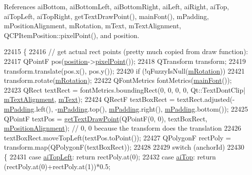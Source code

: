 References ai\+Bottom, ai\+Bottom\+Left, ai\+Bottom\+Right, ai\+Left, ai\+Right, ai\+Top, ai\+Top\+Left, ai\+Top\+Right, get\+Text\+Draw\+Point(), main\+Font(), m\+Padding, m\+Position\+Alignment, m\+Rotation, m\+Text, m\+Text\+Alignment, Q\+C\+P\+Item\+Position\+::pixel\+Point(), and position.


\begin{DoxyCode}
22415 \{
22416   \textcolor{comment}{// get actual rect points (pretty much copied from draw function):}
22417   QPointF pos(\hyperlink{class_q_c_p_item_text_a0d228a00e819022b5690c65762721129}{position}->\hyperlink{class_q_c_p_item_position_ae490f9c76ee2ba33752c495d3b6e8fb5}{pixelPoint}());
22418   QTransform transform;
22419   transform.translate(pos.x(), pos.y());
22420   \textcolor{keywordflow}{if} (!qFuzzyIsNull(\hyperlink{class_q_c_p_item_text_ac37df0061552225d2277e1ee3b48f2cb}{mRotation}))
22421     transform.rotate(\hyperlink{class_q_c_p_item_text_ac37df0061552225d2277e1ee3b48f2cb}{mRotation});
22422   QFontMetrics fontMetrics(\hyperlink{class_q_c_p_item_text_a23d391bd6471c45e73f45add67ede902}{mainFont}());
22423   QRect textRect = fontMetrics.boundingRect(0, 0, 0, 0, Qt::TextDontClip|
      \hyperlink{class_q_c_p_item_text_acdb2e50c38e83da00f083771efbd213f}{mTextAlignment}, \hyperlink{class_q_c_p_item_text_a2dec3e08c11f51639629374ecec3bd62}{mText});
22424   QRectF textBoxRect = textRect.adjusted(-\hyperlink{class_q_c_p_item_text_ae7b3ef0ce6046efd4b346d28f2e1fb67}{mPadding}.left(), -\hyperlink{class_q_c_p_item_text_ae7b3ef0ce6046efd4b346d28f2e1fb67}{mPadding}.top(), 
      \hyperlink{class_q_c_p_item_text_ae7b3ef0ce6046efd4b346d28f2e1fb67}{mPadding}.right(), \hyperlink{class_q_c_p_item_text_ae7b3ef0ce6046efd4b346d28f2e1fb67}{mPadding}.bottom());
22425   QPointF textPos = \hyperlink{class_q_c_p_item_text_aa6e478b1ce198eace89157c4cacc3ddc}{getTextDrawPoint}(QPointF(0, 0), textBoxRect, 
      \hyperlink{class_q_c_p_item_text_a6c27f7dc1a962a04b32430cf99f04654}{mPositionAlignment}); \textcolor{comment}{// 0, 0 because the transform does the translation}
22426   textBoxRect.moveTopLeft(textPos.toPoint());
22427   QPolygonF rectPoly = transform.map(QPolygonF(textBoxRect));
22428   
22429   \textcolor{keywordflow}{switch} (anchorId)
22430   \{
22431     \textcolor{keywordflow}{case} \hyperlink{class_q_c_p_item_text_a14a84e58f72519c8ae1d7a4a1dd23f21a30342ee15065715f045cb52eb77b904c}{aiTopLeft}:     \textcolor{keywordflow}{return} rectPoly.at(0);
22432     \textcolor{keywordflow}{case} \hyperlink{class_q_c_p_item_text_a14a84e58f72519c8ae1d7a4a1dd23f21a55ce9699c71db6d264eb669bb0eb9aff}{aiTop}:         \textcolor{keywordflow}{return} (rectPoly.at(0)+rectPoly.at(1))*0.5;

\end{DoxyCode}
